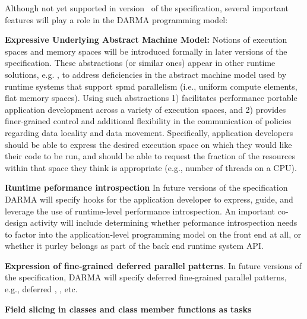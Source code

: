 Although not yet supported in version \specVersion\ of the specification, several
important features will play a role in the \gls{DARMA} \gls{programming model}:
\begin{compactdesc}
\item{\bf Expressive Underlying Abstract Machine Model:}
Notions of \glspl{execution space} and \glspl{memory space} will be introduced
formally in later
versions of the specification.  These abstractions (or similar ones) appear in other runtime
solutions, e.g. \cite{Kokkos}, to
  address deficiencies in the \gls{abstract machine model} used by 
  \glspl{runtime system} that support \gls{spmd} parallelism (i.e., uniform compute elements, flat memory
    spaces).  Using such abstractions
1) facilitates performance portable application development across 
  a variety of \glspl{execution space}, and 2)
  provides finer-grained control and additional flexibility in the
  communication of policies regarding data locality and data movement. 
   Specifically, application developers should be able to express the desired \gls{execution space} on
which they would like their code to be run, and should be able to request the fraction of the resources within
that space they think is appropriate (e.g., number of threads on a CPU).
\item{\bf Runtime peformance introspection}
  In future versions of the specification \gls{DARMA} will specify hooks for the
  application developer to express, guide, and leverage the use of runtime-level
  performance \gls{introspection}. An important \gls{co-design} activity will include determining
  whether peformance \gls{introspection} needs to factor into the
  application-level \gls{programming
  model} on the \gls{front end} at all, or whether it purley belongs as part of the  \gls{back end}
  \gls{runtime system} \gls{API}.
\item{\bf Expression of fine-grained deferred parallel patterns}.
  In future versions of the specification, \gls{DARMA} will 
  specify deferred fine-grained parallel patterns, e.g., deferred
  , , etc.
\item{\bf Field slicing in classes and class member functions as tasks}
\end{compactdesc}
